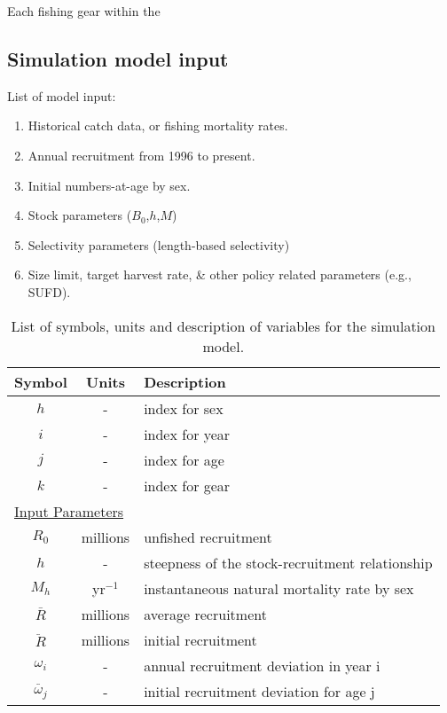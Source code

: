 Each fishing gear within the 

\subsection{Simulation model input} %
\label{sub:simulation_model_input}

List of model input:
\begin{enumerate}
	\item Historical catch data, or fishing mortality rates.
	\item Annual recruitment from 1996 to present.
	\item Initial numbers-at-age by sex.
	\item Stock parameters ($B_0$,$h$,$M$)
	\item Selectivity parameters (length-based selectivity)
	\item Size limit, target harvest rate, \& other policy related parameters (e.g., SUFD).
\end{enumerate}

\begin{table}[ht]
	\caption{List of symbols, units and description of variables for the simulation model.}
	\label{tab:ListOfSymbols}
	\begin{center}
	\begin{tabular}{ccl}
		\hline
		Symbol & Units & Description \\
		\hline
		$h$	& - & index for sex\\
		$i$	& - & index for year\\
		$j$	& - & index for age\\
		$k$	& - & index for gear\\
		\multicolumn{3}{l}{\underline{Input Parameters}}\\
		$R_0$	& millions	& unfished recruitment\\
		$h$		& -			& steepness of the stock-recruitment relationship\\
		$M_h$	& yr$^{-1}$	& instantaneous natural mortality rate by sex \\
		$\bar{R}$ & millions & average recruitment\\
		$\ddot{R}$ & millions & initial recruitment\\
		$\omega_i$ & - & annual recruitment deviation in year i\\
		$\ddot{\omega_j}$ & - & initial recruitment deviation for age j\\
		\hline
	\end{tabular}
	\end{center}
\end{table}

